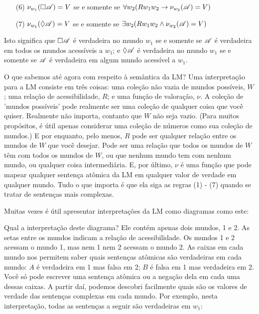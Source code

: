 \begin{itemize}
	\item[(6)]$\nu_{w_1}(\Box \mathscr{A})=V$ se e somente se  $\forall w_2 (Rw_1w_2\rightarrow \nu_{w_2}(\mathscr{A})=V)$
	\item[(7)]$\nu_{w_1}(\Diamond \mathscr{A})=V$ se e somente se  $\exists w_2 (Rw_1w_2\wedge \nu_{w_2}(\mathscr{A})=V)$
\end{itemize}
Isto significa que $\Box\mathscr{A}$ é verdadeira no mundo  $w_1$ se e somente se $\mathscr{A}$ é verdadeira em todos os mundos acessíveis a  $w_1$; e $\Diamond\mathscr{A}$ é verdadeira no mundo  $w_1$ se e somente se $\mathscr{A}$ é verdadeira em algum mundo acessível a  $w_1$.


O que sabemos até agora com respeito à semântica da LM?  Uma interpretação para a LM consiste em três coisas: uma coleção não vazia de mundos possíveis, $W$; uma relação de acessibilidade, $R$; e uma função de valoração, $\nu$. A coleção de 'mundos possíveis' pode realmente ser uma coleção de qualquer coisa que você quiser. Realmente não importa, contanto que $W$ não seja vazio. (Para muitos propósitos, é útil apenas considerar uma coleção de números como sua coleção de mundos.) E por enquanto, pelo menos, $R$ pode ser qualquer relação entre os mundos de $W$ que você desejar. Pode ser uma relação que todos os mundos de $W$ têm com todos os mundos de $W$, ou que nenhum mundo tem com nenhum mundo, ou qualquer coisa intermediária. E, por último, $\nu$ é uma função que pode mapear qualquer sentença atômica da LM em qualquer valor de verdade em qualquer mundo. Tudo o que importa é que ela siga as regras (1) - (7) quando se tratar de sentenças mais complexas.

 Muitas vezes é útil apresentar interpretações da LM como diagramas como este:
\begin{center}
\end{center}
Qual a interpretação deste diagrama? Ele contém apenas dois mundos,  1 e 2. As setas entre os mundos indicam a relação de acessibilidade. Os mundos 1 e  2 acessam o mundo 1, mas nem 1 nem 2 acessam o mundo 2. As caixas em cada mundo nos permitem saber quais sentenças atômicas são verdadeiras em cada mundo: $A$ é verdadeira em  1 mas  falsa em 2; $B$ é  falsa em 1 mas verdadeira em 2. Você só pode escrever uma sentença atômica ou a negação dela  em cada uma dessas caixas. A partir daí, podemos descobri facilmente  quais são   os valores de verdade das sentenças complexas em cada mundo. Por exemplo,  nesta interpretação, todas as sentenças a seguir são verdadeiras em  $w_1$: 
 
